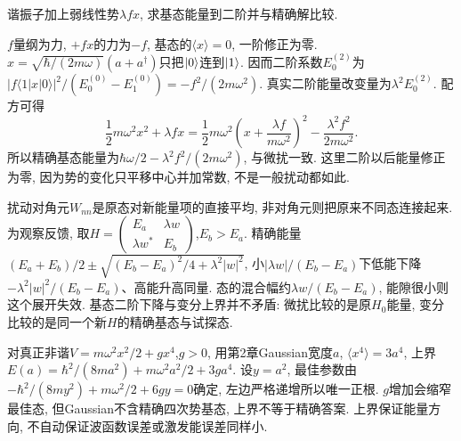 \begin{example}
谐振子加上弱线性势$\lambda f x$, 求基态能量到二阶并与精确解比较.
\end{example}
\begin{solution}
$f$量纲为力, $+fx$的力为$-f$, 基态的$\langle x\rangle=0$, 一阶修正为零. $x=\sqrt{\hbar/(2m\omega)}(a+a^\dagger)$只把$\lvert 0\rangle$连到$\lvert 1\rangle$. 因而二阶系数$E_0^{(2)}$为
$|f\langle1|x|0\rangle|^2/(E_0^{(0)}-E_1^{(0)})=-f^2/(2m\omega^2)$.
真实二阶能量改变量为$\lambda^2E_0^{(2)}$. 配方可得
\[
\frac12m\omega^2x^2+\lambda f x
=\frac12m\omega^2\left(x+\frac{\lambda f}{m\omega^2}\right)^2
-\frac{\lambda^2f^2}{2m\omega^2}.
\]
所以精确基态能量为$\hbar\omega/2-\lambda^2f^2/(2m\omega^2)$, 与微扰一致. 这里二阶以后能量修正为零, 因为势的变化只平移中心并加常数, 不是一般扰动都如此.
\end{solution}

扰动对角元$W_{nn}$是原态对新能量项的直接平均, 非对角元则把原来不同态连接起来. 为观察反馈, 取$H=\left(\begin{smallmatrix}E_a&\lambda w\\\lambda w^*&E_b\end{smallmatrix}\right)$,$E_b>E_a$. 精确能量$(E_a+E_b)/2\pm\sqrt{(E_b-E_a)^2/4+\lambda^2|w|^2}$, 小$|\lambda w|/(E_b-E_a)$下低能下降$-\lambda^2|w|^2/(E_b-E_a)$、高能升高同量. 态的混合幅约$\lambda w/(E_b-E_a)$, 能隙很小则这个展开失效. 基态二阶下降与变分上界并不矛盾: 微扰比较的是原$H_0$能量, 变分比较的是同一个新$H$的精确基态与试探态.

对真正非谐$V=m\omega^2x^2/2+g x^4$,$g>0$, 用第2章Gaussian宽度$a$, $\langle x^4\rangle=3a^4$, 上界$E(a)=\hbar^2/(8ma^2)+m\omega^2a^2/2+3ga^4$. 设$y=a^2$, 最佳参数由$-\hbar^2/(8my^2)+m\omega^2/2+6gy=0$确定, 左边严格递增所以唯一正根. $g$增加会缩窄最佳态, 但Gaussian不含精确四次势基态, 上界不等于精确答案. 上界保证能量方向, 不自动保证波函数误差或激发能误差同样小.
